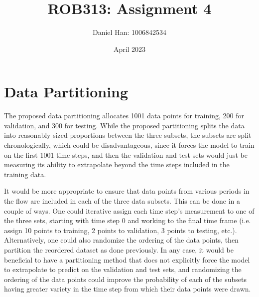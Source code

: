 \documentclass{article}
\title{ROB313: Assignment 4}
\author{Daniel Han: 1006842534}
\date{April 2023}
\begin{document}
\maketitle


\section{Data Partitioning}
The proposed data partitioning allocates 1001 data points for training, 200 for validation, and 300 for testing. While the proposed partitioning splits the data into reasonably sized proportions between the three subsets, the subsets are split chronologically, which could be disadvantageous, since it forces the model to train on the first 1001 time steps, and then the validation and test sets would just be measuring its ability to extrapolate beyond the time steps included in the training data.

It would be more appropriate to ensure that data points from various periods in the flow are included in each of the three data subsets. This can be done in a couple of ways. One could iterative assign each time step's measurement to one of the three sets, starting with time step 0 and working to the final time frame (i.e. assign 10 points to training, 2 points to validation, 3 points to testing, etc.). Alternatively, one could also randomize the ordering of the data points, then partition the reordered dataset as done previously. In any case, it would be beneficial to have a partitioning method that does not explicitly force the model to extrapolate to predict on the validation and test sets, and randomizing the ordering of the data points could improve the probability of each of the subsets having greater variety in the time step from which their data points were drawn.
\end{document}
